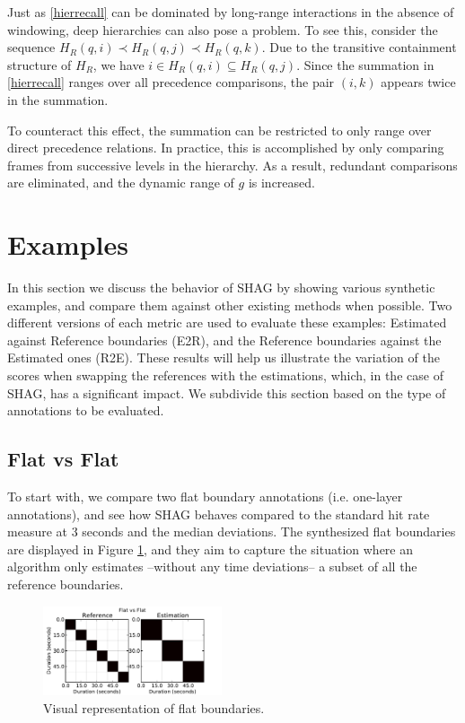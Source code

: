 \documentclass{article}
\begin{document}
Just as \cref{hierrecall} can be dominated by long-range interactions in the absence
of windowing, deep hierarchies can also pose a problem.  To see this, consider the 
sequence $H_R(q, i) \prec H_R(q, j) \prec H_R(q, k)$.  Due to the transitive
containment structure of $H_R$, we have $i \in H_R(q, i) \subseteq H_R(q, j)$.
Since the summation in \cref{hierrecall} ranges over all precedence comparisons, the
pair $(i, k)$ appears twice in the summation.  

To counteract this effect, the summation can be restricted to only range over direct
precedence relations.  In practice, this is accomplished by only comparing frames from
successive levels in the hierarchy.  As a result, redundant comparisons are
eliminated, and the dynamic range of $g$ is increased.

\section{Examples}\label{sec:using_method}

In this section we discuss the behavior of SHAG by showing various synthetic examples, and compare them against other existing methods when possible.
Two different versions of each metric are used to evaluate these examples: Estimated against Reference boundaries (E2R), and the Reference boundaries against the Estimated ones (R2E).
These results will help us illustrate the variation of the scores when swapping the references with the estimations, which, in the case of SHAG, has a significant impact.
We subdivide this section based on the type of annotations to be evaluated.

\subsection{Flat vs Flat}

To start with, we compare two flat boundary annotations (i.e. one-layer annotations), and see how SHAG behaves compared to the standard hit rate measure at 3 seconds and the median deviations.
The synthesized flat boundaries are displayed in Figure \ref{fig:flat-flat}, and they aim to capture the situation where an algorithm only estimates --without any time deviations-- a subset of all the reference boundaries.

\begin{figure}
  \centering
  \includegraphics[width=0.47\textwidth]{plots/flat-flat.pdf}
  \caption{Visual representation of flat boundaries.}
  \label{fig:flat-flat}
\end{figure}%
\end{document}
